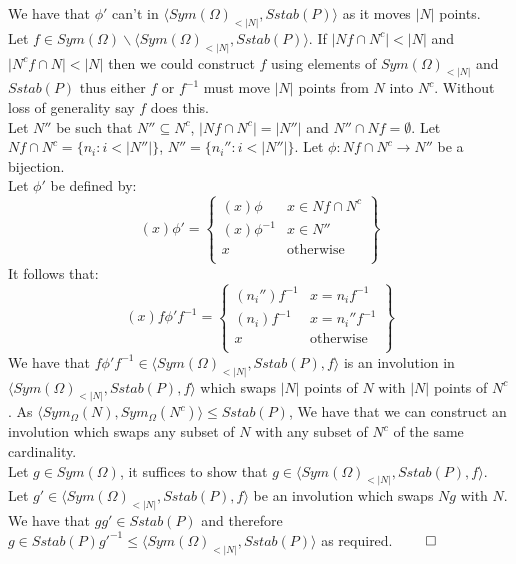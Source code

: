 \documentclass{report}
\begin{document}
We have that $\phi'$ can't in $\langle Sym(\Omega)_{<\vert N \vert},Sstab(P)\rangle$ as it moves $\vert N \vert$ points.\\
Let $f \in Sym(\Omega)\backslash \langle Sym(\Omega)_{<\vert N \vert},Sstab(P)\rangle$. If $\vert Nf \cap N^c \vert < \vert N \vert$ and $\vert N^cf \cap N \vert < \vert N \vert$ then we could construct $f$ using elements of $Sym(\Omega)_{<\vert N \vert}$ and $Sstab(P)$ thus either $f$ or $f^{-1}$ must move $\vert N \vert$ points from $N$ into $N^c$. Without loss of generality say $f$ does this.\\
Let $N''$ be such that $N'' \subseteq N^c$, $\vert Nf \cap N^c \vert = \vert N'' \vert$ and $N'' \cap Nf = \emptyset$. Let $Nf \cap N^c=\{n_i:i<\vert N'' \vert\}$, $N''=\{n_i'':i<\vert N'' \vert\}$. Let $\phi:Nf \cap N^c \rightarrow N''$ be a bijection.\\
Let $\phi'$ be defined by:
\[(x)\phi' =  \left\{
    \begin{array}{lr}
      (x)\phi&  x\in Nf \cap N^c  \\
      (x)\phi^{-1}& x\in N''\\
      x& \text{otherwise}\\
    \end{array}
    \right\}\]
It follows that:
\[(x)f\phi' f^{-1} =  \left\{
    \begin{array}{lr}
      (n_i'')f^{-1}&  x = n_if^{-1}  \\
      (n_i)f^{-1}& x = n_i''f^{-1}\\
      x& \text{otherwise}\\
    \end{array}
    \right\}\]
We have that $f\phi'f^{-1}  \in \langle Sym(\Omega)_{<\vert N \vert},Sstab(P), f\rangle$ is an involution in $\langle Sym(\Omega)_{<\vert N \vert},Sstab(P), f\rangle$ which swaps $\vert N \vert$ points of $N$ with $\vert N \vert $ points of $N^c$. As $\langle Sym_{\Omega}(N), Sym_{\Omega}(N^c) \rangle \leq Sstab(P)$, We have that we can construct an involution which swaps any subset of $N$ with any subset of $N^c$ of the same cardinality.\\
Let $g\in Sym(\Omega)$, it suffices to show that $g \in \langle Sym(\Omega)_{<\vert N \vert},Sstab(P), f\rangle$.\\ 
Let $g' \in \langle Sym(\Omega)_{<\vert N \vert},Sstab(P), f\rangle$ be an involution which swaps $Ng$ with $N$. We have that $gg' \in Sstab(P)$ and therefore $g \in Sstab(P)g'^{-1} \leq \langle Sym(\Omega)_{<\vert N \vert},Sstab(P)\rangle $ as required. $\qed$
\end{document}
